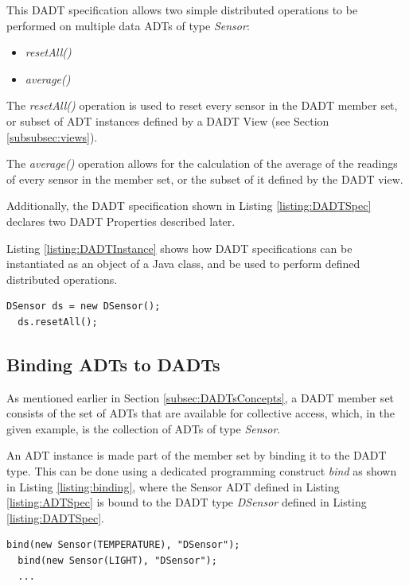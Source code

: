 This DADT specification allows two simple distributed operations to be performed
on multiple data ADTs of type \emph{Sensor}:  
\begin{itemize}
\item \emph{resetAll()} 
\item \emph{average()} 
\end{itemize}

The \emph{resetAll()} operation is used to reset every sensor in the DADT member
set, or subset of ADT instances defined by a DADT View (see Section
\ref{subsubsec:views}).

The \emph{average()} operation allows for the calculation of the average of the readings of every
sensor in the member set, or the subset of it defined by the DADT view.

Additionally, the DADT specification  shown in Listing \ref{listing:DADTSpec}
declares two DADT Properties described later.

Listing \ref{listing:DADTInstance} shows how DADT specifications can be
instantiated as an object of a Java class, and be used to perform defined
distributed operations.

\begin{lstlisting}[frame=trbl, basewidth={0.55em, 0.6em}, captionpos=b, 
basicstyle=\ttfamily\footnotesize, breaklines, caption = DADT Instantiation 
(reproduced from \cite{migliavacca_DADT:2006}), label = listing:DADTInstance ]
  DSensor ds = new DSensor();
  ds.resetAll();
\end{lstlisting}

\subsection{Binding ADTs to DADTs}

As mentioned earlier in Section \ref{subsec:DADTsConcepts}, a DADT member set
consists of the set of ADTs that are available for collective
access, which, in the given example, is the collection of ADTs of type \emph{Sensor}.

An ADT instance is made part of the member set by binding it to the DADT type.
This can be done using a dedicated programming construct \emph{bind} as shown in
Listing \ref{listing:binding}, where the Sensor ADT defined in Listing
\ref{listing:ADTSpec} is bound to the DADT type \emph{DSensor} defined in Listing \ref{listing:DADTSpec}.
 
\begin{lstlisting}[frame=trbl, basewidth={0.55em, 0.6em}, captionpos=b, 
basicstyle=\ttfamily\footnotesize, breaklines, caption = Binding ADT instances to a DADT instance, label = listing:binding]
  bind(new Sensor(TEMPERATURE), "DSensor");
  bind(new Sensor(LIGHT), "DSensor");
  ...
\end{lstlisting} 

